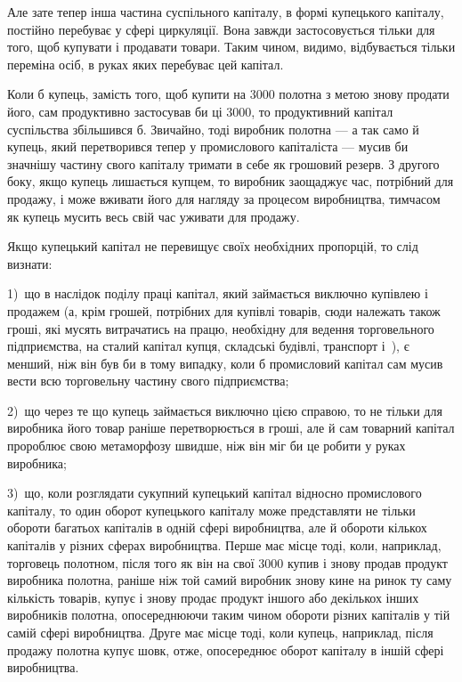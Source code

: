 Але зате тепер інша частина суспільного капіталу, в формі
купецького капіталу, постійно перебуває у сфері циркуляції.
Вона завжди застосовується тільки для того, щоб купувати
і продавати товари. Таким чином, видимо, відбувається тільки
переміна осіб, в руках яких перебуває цей капітал.

Коли б купець, замість того, щоб купити на 3000 полотна з метою знову продати його, сам продуктивно
застосував би ці 3000, то продуктивний капітал
суспільства збільшився б. Звичайно, тоді виробник полотна —
а так само й купець, який перетворився тепер у промислового
капіталіста — мусив би значнішу частину свого капіталу тримати
в себе як грошовий резерв. З другого боку, якщо купець
лишається купцем, то виробник заощаджує час, потрібний
для продажу, і може вживати його для нагляду за процесом
виробництва, тимчасом як купець мусить весь свій час уживати
для продажу.

Якщо купецький капітал не перевищує своїх необхідних пропорцій,
то слід визнати:

1)~що в наслідок поділу праці капітал, який займається виключно
купівлею і продажем (а, крім грошей, потрібних для
купівлі товарів, сюди належать також гроші, які мусять витрачатись
на працю, необхідну для ведення торговельного підприємства,
на сталий капітал купця, складські будівлі, транспорт
і~), є менший, ніж він був би в тому випадку, коли б промисловий
капітал сам мусив вести всю торговельну частину
свого підприємства;

2)~що через те що купець займається виключно цією справою,
то не тільки для виробника його товар раніше перетворюється
в гроші, але й сам товарний капітал пророблює свою
метаморфозу швидше, ніж він міг би це робити у руках виробника;

3)~що, коли розглядати сукупний купецький капітал відносно
промислового капіталу, то один оборот купецького капіталу
може представляти не тільки обороти багатьох капіталів в одній
сфері виробництва, але й обороти кількох капіталів у різних
сферах виробництва. Перше має місце тоді, коли, наприклад,
торговець полотном, після того як він на свої 3000 купив і знову продав продукт виробника полотна,
раніше ніж той самий виробник знову кине на ринок ту саму
кількість товарів, купує і знову продає продукт іншого або декількох
інших виробників полотна, опосереднюючи таким чином
обороти різних капіталів у тій самій сфері виробництва. Друге
має місце тоді, коли купець, наприклад, після продажу полотна
купує шовк, отже, опосереднює оборот капіталу в іншій сфері
виробництва.

